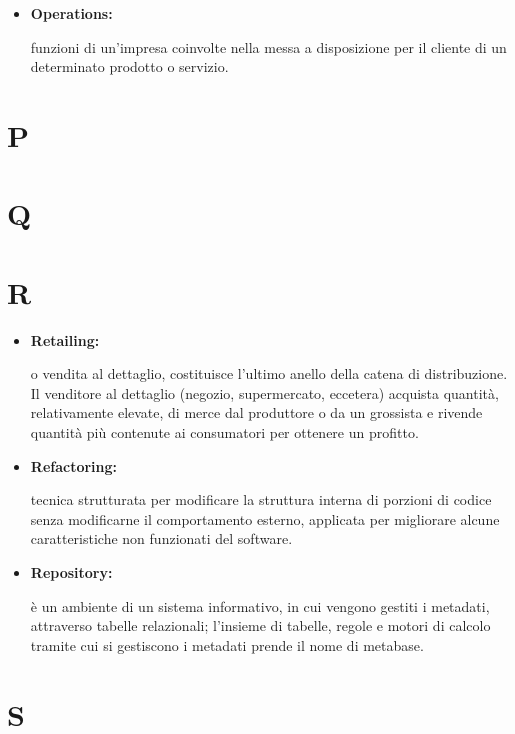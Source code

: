 \begin{itemize}
	\item \hypertarget{ops}{\textbf{Operations:}} funzioni di un'impresa coinvolte nella messa a disposizione per il cliente di un determinato prodotto o servizio.  
\end{itemize}

\section*{P}

\section*{Q}

\section*{R}

\begin{itemize}
	\item \hypertarget{ret}{\textbf{Retailing:}} o vendita al dettaglio, costituisce l'ultimo anello della catena di distribuzione. Il venditore al dettaglio (negozio, supermercato, eccetera) acquista quantità, relativamente elevate, di merce dal produttore o da un grossista e rivende quantità più contenute ai consumatori per ottenere un profitto.
\end{itemize}

\begin{itemize}
	\item \hypertarget{ref}{\textbf{Refactoring:}} tecnica strutturata per modificare la struttura interna di porzioni di codice senza modificarne il comportamento esterno, applicata per migliorare alcune caratteristiche non funzionati del software.
	
	\item \hypertarget{rep}{\textbf{Repository:}} è un ambiente di un sistema informativo, in cui vengono gestiti i metadati, attraverso tabelle relazionali; l'insieme di tabelle, regole e motori di calcolo tramite cui si gestiscono i metadati prende il nome di metabase.
	
\end{itemize}

\section*{S}

